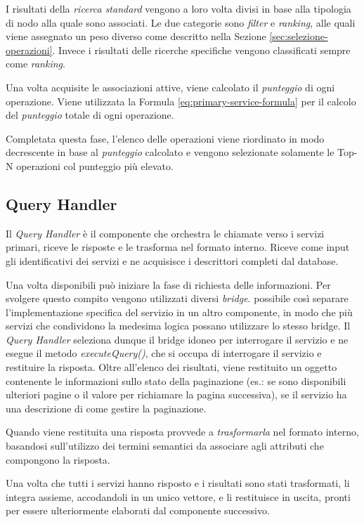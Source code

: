I risultati della \emph{ricerca standard} vengono a loro volta divisi in base alla tipologia di nodo alla quale sono associati. Le due categorie sono \emph{filter} e \emph{ranking}, alle quali viene assegnato un peso diverso come descritto nella Sezione \ref{sec:selezione-operazioni}. Invece i risultati delle ricerche specifiche vengono classificati sempre come \emph{ranking}.

Una volta acquisite le associazioni attive, viene calcolato il \emph{punteggio} di ogni operazione. Viene utilizzata la Formula \ref{eq:primary-service-formula} per il calcolo del \emph{punteggio} totale di ogni operazione.

Completata questa fase, l'elenco delle operazioni viene riordinato in modo decrescente in base al \emph{punteggio} calcolato e vengono selezionate solamente le Top-N operazioni col punteggio più elevato. 

\subsection{Query Handler\label{sec:query-handler}}

Il \emph{Query Handler} è il componente che orchestra le chiamate verso i servizi primari, riceve le risposte e le trasforma nel formato interno. Riceve come input gli identificativi dei servizi e ne acquisisce i descrittori completi dal database.

Una volta disponibili può iniziare la fase di richiesta delle informazioni. Per svolgere questo compito vengono utilizzati diversi \emph{bridge}. \upe possibile così separare l'implementazione specifica del servizio in un altro componente, in modo che più servizi che condividono la medesima logica possano utilizzare lo stesso bridge. Il \emph{Query Handler} seleziona dunque il bridge idoneo per interrogare il servizio e ne esegue il metodo \emph{executeQuery()}, che si occupa di interrogare il servizio e restituire la risposta. Oltre all'elenco dei risultati, viene restituito un oggetto contenente le informazioni sullo stato della paginazione (es.: se sono disponibili ulteriori pagine o il valore per richiamare la pagina successiva), se il servizio ha una descrizione di come gestire la paginazione.

Quando viene restituita una risposta provvede a \emph{trasformarla} nel formato interno, basandosi sull'utilizzo dei termini semantici da associare agli attributi che compongono la risposta.

Una volta che tutti i servizi hanno risposto e i risultati sono stati trasformati, li integra assieme, accodandoli in un unico vettore, e li restituisce in uscita, pronti per essere ulteriormente elaborati dal componente successivo.

